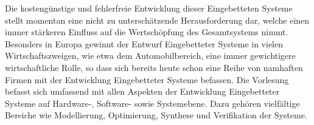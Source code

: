 \begin{module}
\begin{learningoutcomes}
\end{learningoutcomes}

\begin{content}
Die kostengünstige und fehlerfreie Entwicklung dieser Eingebetteten Systeme stellt momentan eine nicht zu unterschätzende Herausforderung dar, welche einen immer stärkeren Einfluss auf die Wertschöpfung des Gesamtsystems nimmt. Besonders in Europa gewinnt der Entwurf Eingebetteter Systeme in vielen Wirtschaftszweigen, wie etwa dem Automobilbereich, eine immer gewichtigere wirtschaftliche Rolle, so dass sich bereits heute schon eine Reihe von namhaften Firmen mit der Entwicklung Eingebetteter Systeme befassen.\newline
Die Vorlesung befasst sich umfassend mit allen Aspekten der Entwicklung Eingebetteter Systeme auf Hardware-, Software- sowie Systemebene. Dazu gehören vielfältige Bereiche wie Modellierung, Optimierung, Synthese und Verifikation der Systeme.


\end{content}



\end{module}

